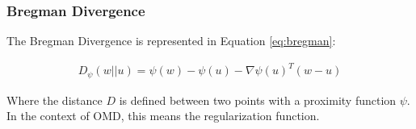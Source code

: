 \documentclass[11pt]{article}
\begin{document}
\subsubsection{Bregman Divergence}

The Bregman Divergence is represented in Equation \ref{eq:bregman}:

\begin{align}
    D_\psi(w||u) = \psi(w) - \psi(u) - \nabla\psi(u)^T(w-u)  \label{eq:bregman}
\end{align}

Where the distance $D$ is defined between two points with a proximity function $\psi$. In the context of OMD, this means the regularization function.

\end{document}
